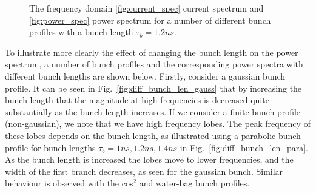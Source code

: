 \begin{figure}
\label{fig:freq_dom_prof}
\caption{The frequency domain \ref{fig:current_spec} current spectrum and \ref{fig:power_spec} power spectrum for a number of different bunch profiles with a bunch length $\tau_{b} = 1.2ns$.}
\end{figure}

To illustrate more clearly the effect of changing the bunch length on the power spectrum, a number of bunch profiles and the corresponding power spectra with different bunch lengths are shown below. Firstly, consider a gaussian bunch profile. It can be seen in Fig.~\ref{fig:diff_bunch_len_gauss} that by increasing the bunch length that the magnitude at high frequencies is decreased quite substantially as the bunch length increases. If we consider a finite bunch profile (non-gaussian), we note that we have high frequency lobes. The peak frequency of these lobes depends on the bunch length, as illustrated using a parabolic bunch profile for bunch lengths $\tau_{b} = 1ns, 1.2ns, 1.4ns$ in Fig.~\ref{fig:diff_bunch_len_para}. As the bunch length is increased the lobes move to lower frequencies, and the width of the first branch decreases, as seen for the gaussian bunch. Similar behaviour is observed with the cos$^{2}$ and water-bag bunch profiles.

